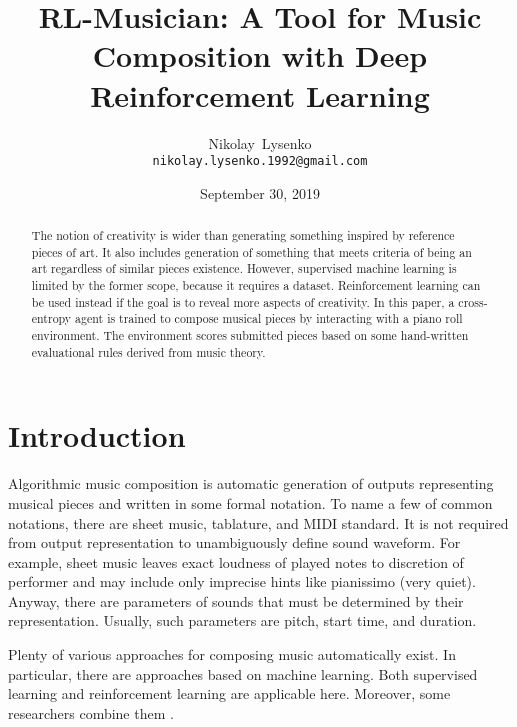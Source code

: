 \documentclass{article}
\title{RL-Musician: A Tool for Music Composition with Deep Reinforcement Learning}
\date{September 30, 2019}
\author{
  Nikolay~Lysenko\\
  \texttt{nikolay.lysenko.1992@gmail.com} \\
}
\begin{document}
\maketitle

\begin{abstract}
The notion of creativity is wider than generating something inspired by reference pieces of art. It also includes generation of something that meets criteria of being an art regardless of similar pieces existence. However, supervised machine learning is limited by the former scope, because it requires a dataset. Reinforcement learning can be used instead if the goal is to reveal more aspects of creativity. In this paper, a cross-entropy agent is trained to compose musical pieces by interacting with a piano roll environment. The environment scores submitted pieces based on some hand-written evaluational rules derived from music theory.
\end{abstract}



\section{Introduction}
\label{sec:introduction}

Algorithmic music composition is automatic generation of outputs representing musical pieces and written in some formal notation. To name a few of common notations, there are sheet music, tablature, and MIDI standard. It is not required from output representation to unambiguously define sound waveform. For example, sheet music leaves exact loudness of played notes to discretion of performer and may include only imprecise hints like pianissimo (very quiet). Anyway, there are parameters of sounds that must be determined by their representation. Usually, such parameters are pitch, start time, and duration.


Plenty of various approaches for composing music automatically exist. In particular, there are approaches based on machine learning. Both supervised learning and reinforcement learning are applicable here. Moreover, some researchers combine them \cite{jaques2016generating}.
\end{document}
